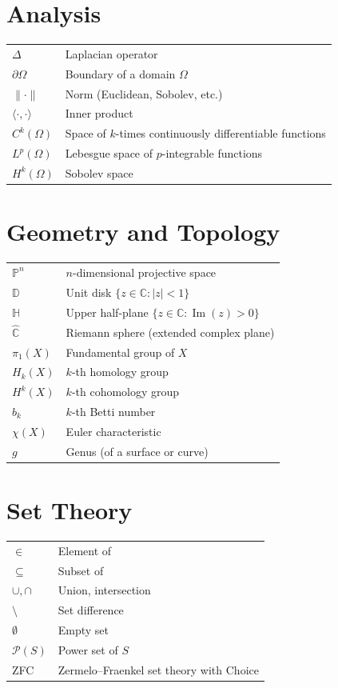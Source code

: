 \section*{Analysis}

\begin{tabular}{ll}
$\Delta$ & Laplacian operator \\
$\partial\Omega$ & Boundary of a domain $\Omega$ \\
$\|\cdot\|$ & Norm (Euclidean, Sobolev, etc.) \\
$\langle \cdot, \cdot \rangle$ & Inner product \\
$C^k(\Omega)$ & Space of $k$-times continuously differentiable functions \\
$L^p(\Omega)$ & Lebesgue space of $p$-integrable functions \\
$H^k(\Omega)$ & Sobolev space \\
\end{tabular}

\section*{Geometry and Topology}

\begin{tabular}{ll}
$\mathbb{P}^n$ & $n$-dimensional projective space \\
$\mathbb{D}$ & Unit disk $\{z \in \mathbb{C} : |z| < 1\}$ \\
$\mathbb{H}$ & Upper half-plane $\{z \in \mathbb{C} : \operatorname{Im}(z) > 0\}$ \\
$\widehat{\mathbb{C}}$ & Riemann sphere (extended complex plane) \\
$\pi_1(X)$ & Fundamental group of $X$ \\
$H_k(X)$ & $k$-th homology group \\
$H^k(X)$ & $k$-th cohomology group \\
$b_k$ & $k$-th Betti number \\
$\chi(X)$ & Euler characteristic \\
$g$ & Genus (of a surface or curve) \\
\end{tabular}

\section*{Set Theory}

\begin{tabular}{ll}
$\in$ & Element of \\
$\subseteq$ & Subset of \\
$\cup, \cap$ & Union, intersection \\
$\setminus$ & Set difference \\
$\emptyset$ & Empty set \\
$\mathcal{P}(S)$ & Power set of $S$ \\
ZFC & Zermelo--Fraenkel set theory with Choice \\
\end{tabular}
